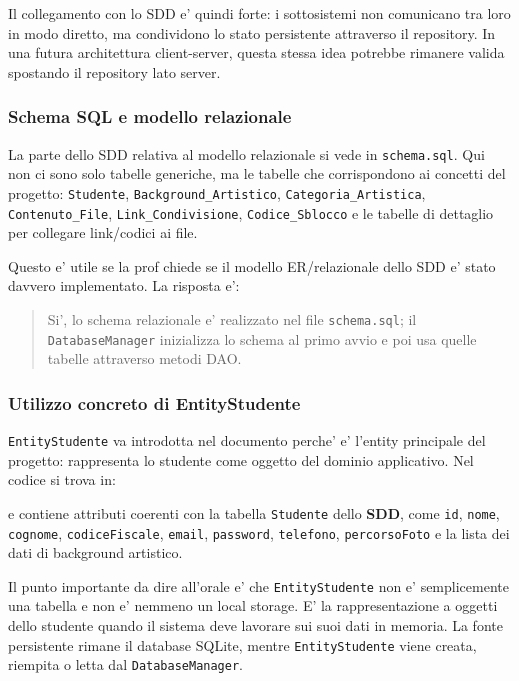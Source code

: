 ﻿\documentclass[11pt,a4paper]{article}
\newcommand{\doc}[1]{\textbf{#1}}
\begin{document}
Il collegamento con lo SDD e' quindi forte: i sottosistemi non comunicano tra loro in modo
diretto, ma condividono lo stato persistente attraverso il repository. In una futura
architettura client-server, questa stessa idea potrebbe rimanere valida spostando il
repository lato server.

\subsubsection{Schema SQL e modello relazionale}

La parte dello SDD relativa al modello relazionale si vede in \texttt{schema.sql}. Qui non
ci sono solo tabelle generiche, ma le tabelle che corrispondono ai concetti del progetto:
\texttt{Studente}, \texttt{Background\_Artistico}, \texttt{Categoria\_Artistica},
\texttt{Contenuto\_File}, \texttt{Link\_Condivisione}, \texttt{Codice\_Sblocco} e le tabelle
di dettaglio per collegare link/codici ai file.

Questo e' utile se la prof chiede se il modello ER/relazionale dello SDD e' stato davvero
implementato. La risposta e':
\begin{quote}
Si', lo schema relazionale e' realizzato nel file \texttt{schema.sql}; il
\texttt{DatabaseManager} inizializza lo schema al primo avvio e poi usa quelle tabelle
attraverso metodi DAO.
\end{quote}

\subsubsection{Utilizzo concreto di EntityStudente}

\texttt{EntityStudente} va introdotta nel documento perche' e' l'entity principale del
progetto: rappresenta lo studente come oggetto del dominio applicativo. Nel codice si trova
in:
\begin{center}
\end{center}
e contiene attributi coerenti con la tabella \texttt{Studente} dello \doc{SDD}, come
\texttt{id}, \texttt{nome}, \texttt{cognome}, \texttt{codiceFiscale}, \texttt{email},
\texttt{password}, \texttt{telefono}, \texttt{percorsoFoto} e la lista dei dati di
background artistico.

Il punto importante da dire all'orale e' che \texttt{EntityStudente} non e' semplicemente
una tabella e non e' nemmeno un local storage. E' la rappresentazione a oggetti dello
studente quando il sistema deve lavorare sui suoi dati in memoria. La fonte persistente
rimane il database SQLite, mentre \texttt{EntityStudente} viene creata, riempita o letta
dal \texttt{DatabaseManager}.
\end{document}
